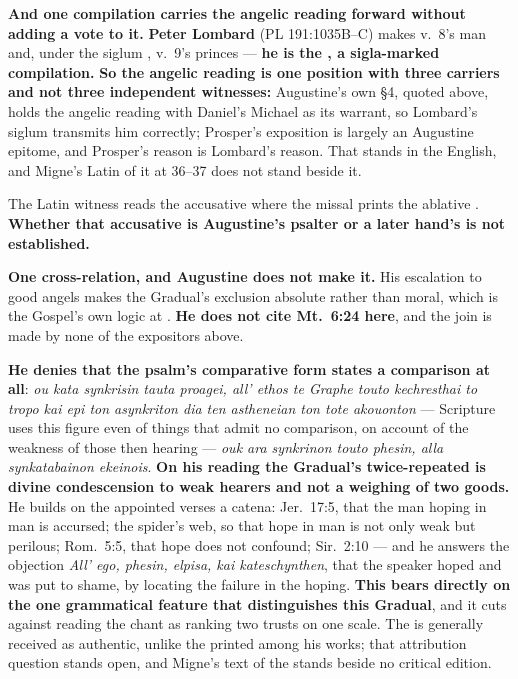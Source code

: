 \textbf{And one compilation carries the angelic reading forward without adding a
vote to it.} \textbf{Peter Lombard} (PL 191:1035B--C) makes v.~8's man
 and, under the siglum \latin{[Aug.]},
v.~9's princes  --- \textbf{he is the , a sigla-marked
compilation.} \textbf{So the angelic reading is one position with
three carriers and not three independent witnesses:} Augustine's own
 §4, quoted above, holds the
angelic reading with Daniel's Michael as its warrant, so Lombard's siglum
transmits him correctly; Prosper's exposition is largely an Augustine epitome,
and Prosper's reason is Lombard's reason. That  stands in
the  English, and Migne's Latin of it at
 36--37 does not stand beside it.

The Latin witness reads the accusative  where the missal prints the ablative .
\textbf{Whether that accusative is Augustine's psalter or a later hand's is not
established.}

\textbf{One cross-relation, and Augustine does not make it.} His
escalation to good angels makes the Gradual's exclusion absolute rather than
moral, which is the Gospel's own logic at . \textbf{He does not cite Mt.\ 6:24 here}, and the join is made by
none of the expositors above.

\begin{witnessnote}
\textbf{He denies that the psalm's comparative form states a comparison at all}:
\emph{ou kata synkrisin tauta proagei, all' ethos te Graphe touto kechresthai to
tropo kai epi ton asynkriton dia ten astheneian ton tote akouonton} ---
Scripture uses this figure even of things that admit no comparison, on account
of the weakness of those then hearing --- \emph{ouk ara synkrinon touto phesin,
alla synkatabainon ekeinois}. \textbf{On his reading the Gradual's
twice-repeated  is divine condescension to weak
hearers and not a weighing of two goods.} He builds on the appointed verses a
catena: Jer.\ 17:5, that the man hoping in man is accursed; the spider's web, so
that hope in man is not only weak but perilous; Rom.\ 5:5, that hope does not
confound; Sir.\ 2:10 --- and he answers the objection \emph{All' ego, phesin,
elpisa, kai kateschynthen}, that the speaker hoped and was put to shame, by
locating the failure in the hoping. \textbf{This bears directly on
the one grammatical feature that distinguishes this Gradual}, and it cuts
against reading the chant as ranking two trusts on one scale. The
 is generally received as authentic, unlike the
 printed among his works; that attribution question
stands open, and Migne's text of the  stands beside no critical
edition.
\end{witnessnote}

